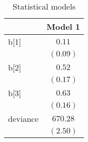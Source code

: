 \begin{table}
\begin{center}
\begin{tabular}{l c}
\hline
 & Model 1 \\
\hline
b[1]     & $0.11$   \\
         & $(0.09)$ \\
b[2]     & $0.52$   \\
         & $(0.17)$ \\
b[3]     & $0.63$   \\
         & $(0.16)$ \\
deviance & $670.28$ \\
         & $(2.50)$ \\
\hline
\end{tabular}
\caption{Statistical models}
\label{table:coefficients}
\end{center}
\end{table}
